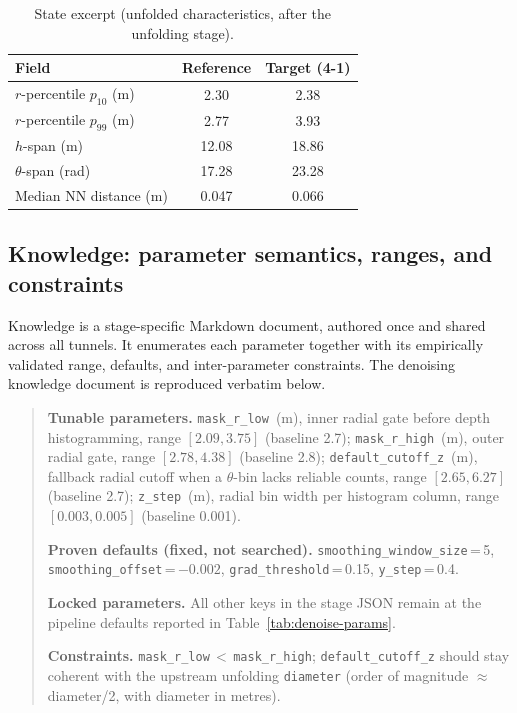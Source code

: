 \begin{table}[ht]
\caption{State excerpt (unfolded characteristics, after the unfolding stage).}\label{tab:context-state}
\begin{tabular*}{\tblwidth}{@{} l c c @{}}
\toprule
Field & Reference & Target (4-1) \\
\midrule
$r$-percentile $p_{10}$ (m) & 2.30 & 2.38 \\
$r$-percentile $p_{99}$ (m) & 2.77 & 3.93 \\
$h$-span (m) & 12.08 & 18.86 \\
$\theta$-span (rad) & 17.28 & 23.28 \\
Median NN distance (m) & 0.047 & 0.066 \\
\bottomrule
\end{tabular*}
\end{table}

\subsection{Knowledge: parameter semantics, ranges, and constraints}\label{app:context-knowledge}
Knowledge is a stage-specific Markdown document, authored once and shared across all tunnels. It enumerates each parameter together with its empirically validated range, defaults, and inter-parameter constraints. The denoising knowledge document is reproduced verbatim below.

\begin{quote}\small
\textbf{Tunable parameters.}
\texttt{mask\_r\_low}~(m), inner radial gate before depth histogramming, range $[2.09, 3.75]$ (baseline 2.7);
\texttt{mask\_r\_high}~(m), outer radial gate, range $[2.78, 4.38]$ (baseline 2.8);
\texttt{default\_cutoff\_z}~(m), fallback radial cutoff when a $\theta$-bin lacks reliable counts, range $[2.65, 6.27]$ (baseline 2.7);
\texttt{z\_step}~(m), radial bin width per histogram column, range $[0.003, 0.005]$ (baseline 0.001).

\textbf{Proven defaults (fixed, not searched).}
\texttt{smoothing\_window\_size}\,=\,5,
\texttt{smoothing\_offset}\,=\,$-0.002$,
\texttt{grad\_threshold}\,=\,0.15,
\texttt{y\_step}\,=\,0.4.

\textbf{Locked parameters.} All other keys in the stage JSON remain at the pipeline defaults reported in Table~\ref{tab:denoise-params}.

\textbf{Constraints.}
\texttt{mask\_r\_low}\,$<$\,\texttt{mask\_r\_high};
\texttt{default\_cutoff\_z} should stay coherent with the upstream unfolding \texttt{diameter} (order of magnitude $\approx$ diameter/2, with diameter in metres).
\end{quote}

